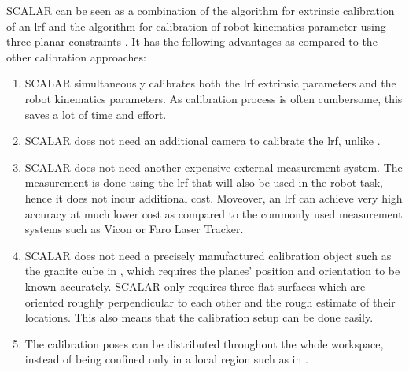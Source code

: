SCALAR can be seen as a combination of the algorithm for extrinsic calibration of an \ac{lrf} \cite{Zhang2004} and the algorithm for calibration of robot kinematics parameter using three planar constraints \cite{Joubair2015}. It has the following advantages as compared to the other calibration approaches:
\begin{enumerate}
\item SCALAR simultaneously calibrates both the \ac{lrf} extrinsic parameters and the robot kinematics parameters. As calibration process is often cumbersome, this saves a lot of time and effort.
\item SCALAR does not need an additional camera to calibrate the \ac{lrf}, unlike \cite{Zhang2004}.
\item SCALAR does not need another expensive external measurement system. The measurement is done using the \ac{lrf} that will also be used in the robot task, hence it does not incur additional cost. Moveover, an \ac{lrf} can achieve very high accuracy at much lower cost as compared to the commonly used measurement systems such as Vicon or Faro Laser Tracker. 
\item SCALAR does not need a precisely manufactured calibration object such as the granite cube in \cite{Joubair2015}, which requires the planes' position and orientation to be known accurately. SCALAR only requires
three flat surfaces which are oriented roughly perpendicular to each other and the rough estimate of their locations. This also means that the calibration setup can be done easily.
\item The calibration poses can be distributed throughout the whole workspace, instead of being confined only in a local region such as in \cite{Joubair2015}. 
\end{enumerate}



